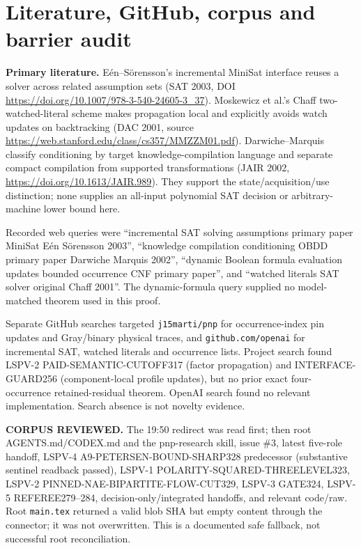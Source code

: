 \documentclass[11pt]{article}
\begin{document}
\section{Literature, GitHub, corpus and barrier audit}
\noindent\textbf{Primary literature.} E\'en--S\"orensson's incremental MiniSat interface reuses a solver across related assumption sets (SAT 2003, DOI \url{https://doi.org/10.1007/978-3-540-24605-3_37}). Moskewicz et al.'s Chaff two-watched-literal scheme makes propagation local and explicitly avoids watch updates on backtracking (DAC 2001, source \url{https://web.stanford.edu/class/cs357/MMZZM01.pdf}). Darwiche--Marquis classify conditioning by target knowledge-compilation language and separate compact compilation from supported transformations (JAIR 2002, \url{https://doi.org/10.1613/JAIR.989}). They support the state/acquisition/use distinction; none supplies an all-input polynomial SAT decision or arbitrary-machine lower bound here.

Recorded web queries were ``incremental SAT solving assumptions primary paper MiniSat E\'en S\"orensson 2003'', ``knowledge compilation conditioning OBDD primary paper Darwiche Marquis 2002'', ``dynamic Boolean formula evaluation updates bounded occurrence CNF primary paper'', and ``watched literals SAT solver original Chaff 2001''. The dynamic-formula query supplied no model-matched theorem used in this proof.

Separate GitHub searches targeted \texttt{j15marti/pnp} for occurrence-index pin updates and Gray/binary physical traces, and \texttt{github.com/openai} for incremental SAT, watched literals and occurrence lists. Project search found LSPV-2 PAID-SEMANTIC-CUTOFF317 (factor propagation) and INTERFACE-GUARD256 (component-local profile updates), but no prior exact four-occurrence retained-residual theorem. OpenAI search found no relevant implementation. Search absence is not novelty evidence.

\noindent\textbf{CORPUS REVIEWED.} The 19:50 redirect was read first; then root AGENTS.md/CODEX.md and the pnp-research skill, issue \#3, latest five-role handoff, LSPV-4 A9-PETERSEN-BOUND-SHARP328 predecessor (substantive sentinel readback passed), LSPV-1 POLARITY-SQUARED-THREELEVEL323, LSPV-2 PINNED-NAE-BIPARTITE-FLOW-CUT329, LSPV-3 GATE324, LSPV-5 REFEREE279--284, decision-only/integrated handoffs, and relevant code/raw. Root \texttt{main.tex} returned a valid blob SHA but empty content through the connector; it was not overwritten. This is a documented safe fallback, not successful root reconciliation.
\end{document}
